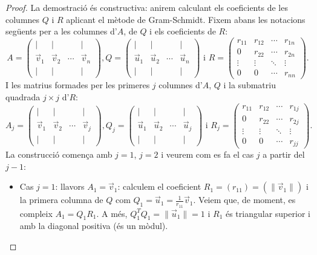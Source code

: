 \begin{proof}
La demostració és constructiva: anirem calculant els coeficients de les columnes $Q$ i $R$ aplicant el mètode de Gram-Schmidt. Fixem abans les notacions següents per a les columnes d'$A$, de $Q$ i els coeficients de $R$:
\[
A=\begin{pmatrix} | & | & & | \\ \vec v_1 & \vec v_2 & \cdots & \vec v_n \\ | & | & & | \end{pmatrix} ,
Q=\begin{pmatrix} | & | & & | \\ \vec u_1 & \vec u_2 & \cdots & \vec u_n \\ | & | & & | \end{pmatrix} 
\text{ i }
R=\begin{pmatrix} r_{11} & r_{12} & \cdots & r_{1n} \\ 0 & r_{22} & \cdots & r_{2n} \\ \vdots & \vdots & \ddots & \vdots \\ 0 & 0 & \cdots & r_{nn}\end{pmatrix}.
\]
I les matrius formades per les primeres $j$ columnes d'$A$, $Q$ i la submatriu quadrada $j\times j$ d'$R$:
\[
A_j=\begin{pmatrix} | & | & & | \\ \vec v_1 & \vec v_2 & \cdots & \vec v_j\\ | & | & & | \end{pmatrix} ,
Q_j=\begin{pmatrix} | & | & & | \\ \vec u_1 & \vec u_2 & \cdots & \vec u_j \\ | & | & & | \end{pmatrix} 
\text{ i }
R_j=\begin{pmatrix} r_{11} & r_{12} & \cdots & r_{1j} \\ 0 & r_{22} & \cdots & r_{2j} \\ \vdots & \vdots & \ddots & \vdots \\ 0 & 0 & \cdots & r_{jj}\end{pmatrix}.
\]
La construcció comença amb $j=1$, $j=2$ i veurem com es fa el cas $j$ a partir del $j-1$:
\begin{itemize}
    \item Cas $j=1$: llavors $A_1=\vec v_1$: calculem el coeficient $R_1=(r_{11})=(\|\vec v_1\|)$ i la primera columna de $Q$ com $Q_1=\vec u_1=\frac{1}{r_{11}}\vec v_1$. Veiem que, de moment, es compleix  $A_1=Q_1R_1$. A més, $Q_1^TQ_1=\|\vec u_1\|=1$ i $R_1$ és triangular superior i amb la diagonal positiva (és un mòdul).

\end{itemize}
\end{proof}
